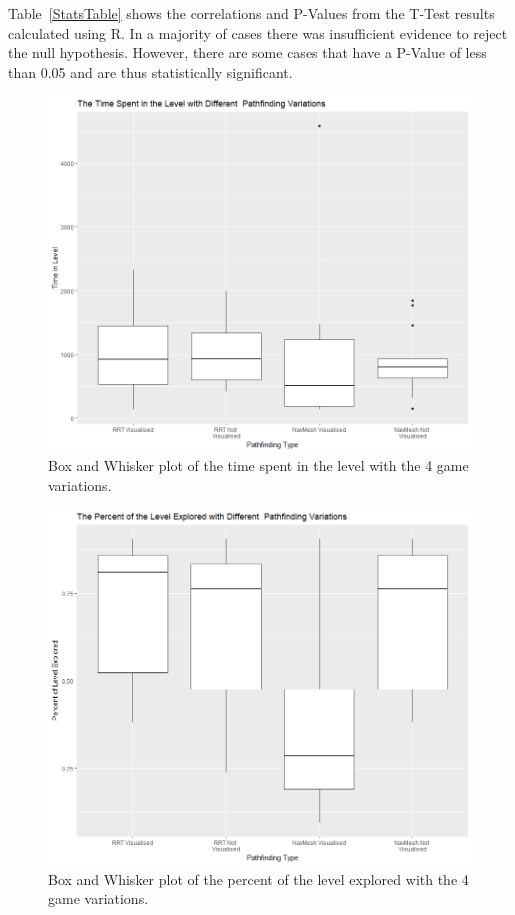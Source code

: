 \documentclass[journal]{IEEEtran}
\begin{document}
	Table~\ref{StatsTable} shows the correlations and P-Values from the T-Test results calculated using R.  In a majority of cases there was insufficient evidence to reject the null hypothesis. However, there are some cases that have a P-Value of less than 0.05 and are thus statistically significant. 
	
	\begin{figure}[h]
		\includegraphics[width=1.0\linewidth]{GraphTime.png}
		\caption{Box and Whisker plot of the time spent in the level with the 4 game variations.}
		\label{graph:Time}
	\end{figure}  
	
	\begin{figure}[h]
		\includegraphics[width=1.0\linewidth]{GraphPercent.png}
		\caption{Box and Whisker plot of the percent of the level explored with the 4 game variations.}
		\label{graph:Percent}
	\end{figure}
	
\end{document}
